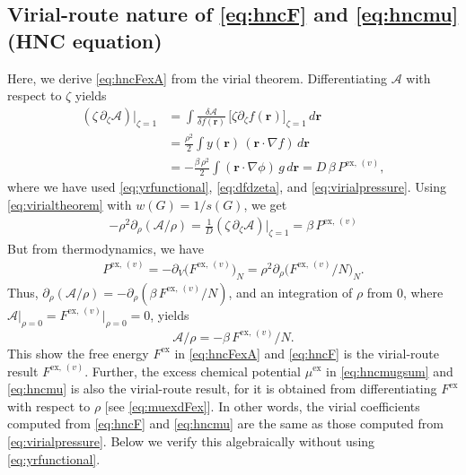 \documentclass[aip,jcp,reprint,superscriptaddress]{revtex4-1}
\newcommand{\vct}[1]{\mathbf{#1}}
\providecommand{\vr}{} %
\renewcommand{\vr}{\vct{r}}
\newcommand{\supex}[1]{ { { #1 }^{ \mathrm{ex} } } }
\newcommand{\supexv}[1]{ { { #1 }^{ \mathrm{ex}, \, (v) } } }
\newcommand{\Pexv}{\supexv{P}}
\newcommand{\Fex}{\supex{F}}
\newcommand{\Fexv}{\supexv{F}}
\newcommand{\muex}{\supex{\mu}}
\newcommand{\A}{\mathcal{A}}
\begin{document}
\subsection{\label{sec:vthnc}Virial-route nature of \eqref{eq:hncF} and \eqref{eq:hncmu} (HNC equation)}

Here, we derive \eqref{eq:hncFexA} from the virial theorem.
%
Differentiating $\A$ with respect to $\zeta$ yields
\begin{align*}
  (\zeta \, \partial_\zeta \A) \big|_{\zeta = 1}
&=
  \int \frac{ \delta \A } { \delta f(\vr) } \,
  \big[ \zeta \partial_\zeta f(\vr) \big]_{\zeta = 1} \, d\vr
  \\
&=
  \frac{\rho^2}{2}
  \int y(\vr) \,
  (\vr \cdot \nabla f) \, d\vr
  \\
&=
  -\frac{ \beta \, \rho^2}{2}
  \int (\vr \cdot \nabla \phi) \, g \, d\vr
= D \, \beta \, \Pexv,
\end{align*}
where we have used \eqref{eq:yrfunctional},
\eqref{eq:dfdzeta}, and \eqref{eq:virialpressure}.
%
Using \eqref{eq:virialtheorem}
with $w(G) = 1/s(G)$, we get
\begin{align*}
  -\rho^2 \partial_\rho ( \A/\rho )
=
  \frac{1}{D} (\zeta \, \partial_\zeta \A) \big|_{\zeta = 1}
=
  \beta \, \Pexv
\end{align*}
%
But from thermodynamics, we have
\begin{align*}
  \Pexv
=
  -\partial_V \bigl( \Fexv \bigr)_N
=
  \rho^2 \partial_\rho \bigl( \Fexv/N \bigr)_N.
\end{align*}
%
Thus,
$\partial_\rho (\A/\rho)  = -\partial_\rho( \beta \, \Fexv/N )$,
and an integration of $\rho$ from 0,
where $\A \big|_{\rho = 0} = \Fexv \big|_{\rho = 0} = 0$, yields
\[
  \A/\rho = -\beta \, \Fexv/N.
\]
This show the free energy $\Fex$ in \eqref{eq:hncFexA} and \eqref{eq:hncF}
is the virial-route result $\Fexv$.
%
%
Further, the excess chemical potential
$\muex$ in \eqref{eq:hncmugsum} and \eqref{eq:hncmu}
is also the virial-route result,
for it is obtained from differentiating $\Fex$
with respect to $\rho$
[see \eqref{eq:muexdFex}].
%
In other words,
the virial coefficients computed from
\eqref{eq:hncF} and \eqref{eq:hncmu}
are the same as those computed from
\eqref{eq:virialpressure}.
%
Below we verify this algebraically
without using \eqref{eq:yrfunctional}.
\end{document}
